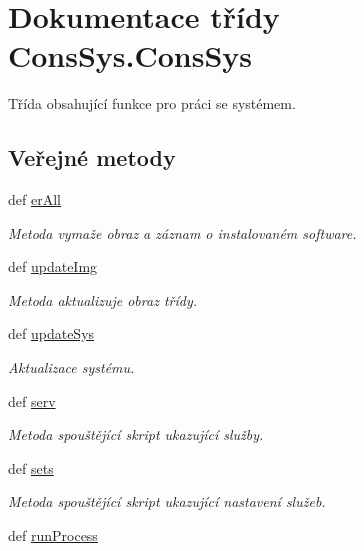 \hypertarget{classConsSys_1_1ConsSys}{\section{Dokumentace třídy Cons\-Sys.\-Cons\-Sys}
\label{d9/d30/classConsSys_1_1ConsSys}
}


Třída obsahující funkce pro práci se systémem.  


\subsection*{Veřejné metody}
\begin{DoxyCompactItemize}
\item 
def \hyperlink{classConsSys_1_1ConsSys_a97a5ac1a37c9649118069803b50c3102}{er\-All}
\begin{DoxyCompactList}\small\item\em Metoda vymaže obraz a záznam o instalovaném software. \end{DoxyCompactList}\item 
def \hyperlink{classConsSys_1_1ConsSys_a4116e6cfbf38f6a6ae7eb6ccc8a545b8}{update\-Img}
\begin{DoxyCompactList}\small\item\em Metoda aktualizuje obraz třídy. \end{DoxyCompactList}\item 
def \hyperlink{classConsSys_1_1ConsSys_adebc704ed551e5de7db2a5fbdae6af62}{update\-Sys}
\begin{DoxyCompactList}\small\item\em Aktualizace systému. \end{DoxyCompactList}\item 
def \hyperlink{classConsSys_1_1ConsSys_aeb3c2474c312e9c4aa5b10fd26c39474}{serv}
\begin{DoxyCompactList}\small\item\em Metoda spouštějící skript ukazující služby. \end{DoxyCompactList}\item 
def \hyperlink{classConsSys_1_1ConsSys_a5ede7c786f39d534aacace0fe599ffcb}{sets}
\begin{DoxyCompactList}\small\item\em Metoda spouštějící skript ukazující nastavení služeb. \end{DoxyCompactList}\item 
def \hyperlink{classConsSys_1_1ConsSys_ab74dd7930d406b91de35d324651bd92e}{run\-Process}

\end{DoxyCompactItemize}
